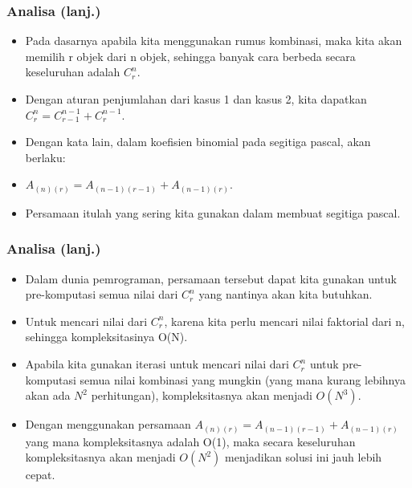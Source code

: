 \begin{frame}
\frametitle{Analisa (lanj.)}
\begin{itemize}
  \item Pada dasarnya apabila kita menggunakan rumus kombinasi, maka kita akan memilih r objek dari n objek, sehingga banyak cara berbeda secara keseluruhan adalah $C^{n}_{r}$.
  \item Dengan aturan penjumlahan dari kasus 1 dan kasus 2, kita dapatkan $C^{n}_{r} = C^{n-1}_{r-1} + C^{n-1}_{r}$.
  \item Dengan kata lain, dalam koefisien binomial pada segitiga pascal, akan berlaku:
  \item $A_{(n)(r)} = A_{(n-1)(r-1)} + A_{(n-1)(r)}$.
  \item Persamaan itulah yang sering kita gunakan dalam membuat segitiga pascal.
\end{itemize}
\end{frame}

\begin{frame}
\frametitle{Analisa (lanj.)}
\begin{itemize}
  \item Dalam dunia pemrograman, persamaan tersebut dapat kita gunakan untuk pre-komputasi semua nilai dari $C^{n}_{r}$ yang nantinya akan kita butuhkan.
  \item Untuk mencari nilai dari $C^{n}_{r}$, karena kita perlu mencari nilai faktorial dari n, sehingga kompleksitasinya O(N).
  \item Apabila kita gunakan iterasi untuk mencari nilai dari $C^{n}_{r}$ untuk pre-komputasi semua nilai kombinasi yang mungkin (yang mana kurang lebihnya akan ada $N^{2}$ perhitungan), kompleksitasnya akan menjadi $O(N^{3})$.
  \item Dengan menggunakan persamaan $A_{(n)(r)} = A_{(n-1)(r-1)} + A_{(n-1)(r)}$ yang mana kompleksitasnya adalah O(1), maka secara keseluruhan kompleksitasnya akan menjadi $O(N^{2})$ menjadikan solusi ini jauh lebih cepat.
\end{itemize}
\end{frame}

